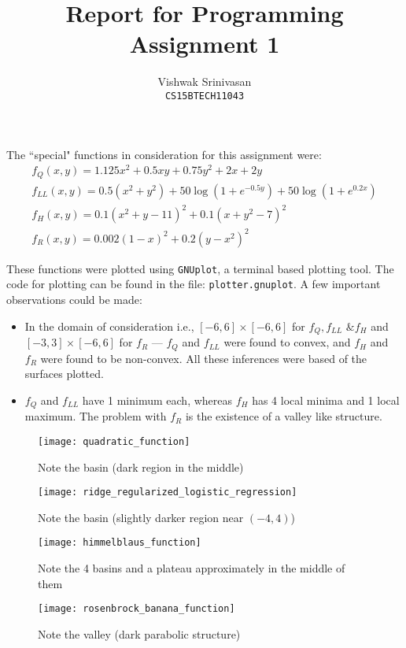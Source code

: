 \documentclass{article}
\title{Report for Programming Assignment 1}
\author{Vishwak Srinivasan\\
\texttt{CS15BTECH11043}}
\date{}
\begin{document}
\maketitle
\begin{flushleft}
The ``special" functions in consideration for this assignment were:
\begin{gather*}
f_{Q}(x, y) = 1.125x^2 + 0.5xy + 0.75y^2 + 2x + 2y \\
f_{LL}(x, y) = 0.5(x^2 + y^2) + 50\log\left(1 + e^{-0.5y}\right) + 50\log\left(1 + e^{0.2x}\right) \\
f_{H}(x, y) = 0.1(x^2 + y - 11)^2 + 0.1(x + y^2 - 7)^2 \\
f_{R}(x, y) = 0.002(1 - x)^2 + 0.2(y - x^2)^2
\end{gather*}

These functions were plotted using \texttt{GNUplot}, a terminal based plotting tool. The code for plotting can be found in the file: \texttt{plotter.gnuplot}. A few important observations could be made:
\begin{itemize}
\item In the domain of consideration i.e., \([-6, 6]\times[-6, 6]\) for \(f_{Q}, f_{LL} \text{ \& } f_{H}\) and \([-3, 3] \times [-6, 6]\) for \(f_{R}\) --- \(f_{Q}\) and \(f_{LL}\) were found to convex, and \(f_{H}\) and \(f_{R}\) were found to be non-convex. All these inferences were based of the surfaces plotted.
\item \(f_{Q}\) and \(f_{LL}\) have 1 minimum each, whereas \(f_{H}\) has 4 local minima and 1 local maximum. The problem with \(f_{R}\) is the existence of a valley like structure.
\end{itemize}

\begin{figure}[H]
\begin{minipage}{0.45\linewidth}
\centering
\texttt{[image: quadratic\_function]}
\caption{Note the basin (dark region in the middle)}
\end{minipage}
\hfill
\begin{minipage}{0.45\linewidth}
\centering
\texttt{[image: ridge\_regularized\_logistic\_regression]}
\caption{Note the basin (slightly darker region near \((-4, 4)\))}
\end{minipage}
\end{figure}

\begin{figure}[H]
\begin{minipage}{0.45\linewidth}
\centering
\texttt{[image: himmelblaus\_function]}
\caption{Note the 4 basins and a plateau approximately in the middle of them}
\end{minipage}
\hfill
\begin{minipage}{0.45\linewidth}
\centering
\texttt{[image: rosenbrock\_banana\_function]}
\caption{Note the valley (dark parabolic structure)}
\end{minipage}
\end{figure}


\end{flushleft}
\end{document}
